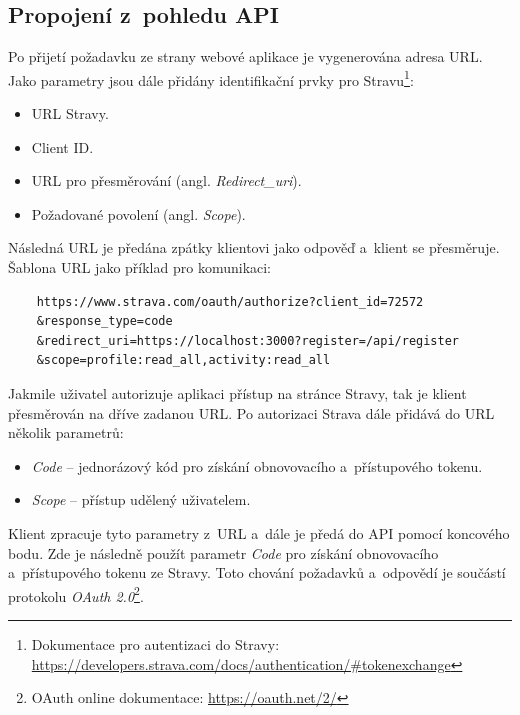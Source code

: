\subsection{Propojení z~pohledu API}
Po přijetí požadavku ze strany webové aplikace je vygenerována adresa URL. Jako parametry jsou dále přidány identifikační prvky pro Stravu\footnote{Dokumentace pro autentizaci do Stravy: \url{https://developers.strava.com/docs/authentication/\#tokenexchange}}:
\begin{itemize}
    \item URL Stravy.
    \item Client ID.
    \item URL pro přesměrování (angl. \emph{Redirect\_uri}).
    \item Požadované povolení (angl. \emph{Scope}).
\end{itemize}
Následná URL je předána zpátky klientovi jako odpověď a~klient se přesměruje.
Šablona URL jako příklad pro komunikaci:
\begin{verbatim}
    https://www.strava.com/oauth/authorize?client_id=72572
    &response_type=code
    &redirect_uri=https://localhost:3000?register=/api/register
    &scope=profile:read_all,activity:read_all
\end{verbatim}
Jakmile uživatel autorizuje aplikaci přístup na stránce Stravy, tak je klient přesměrován na dříve zadanou URL. Po autorizaci Strava dále přidává do URL několik parametrů:
\begin{itemize}
    \item \emph{Code} -- jednorázový kód pro získání obnovovacího a~přístupového tokenu.
    \item \emph{Scope} -- přístup udělený uživatelem.
\end{itemize}
Klient zpracuje tyto parametry z~URL a~dále je předá do API pomocí koncového bodu. Zde je následně použít parametr \emph{Code} pro získání obnovovacího a~přístupového tokenu ze Stravy. Toto chování požadavků a~odpovědí je součástí protokolu \emph{OAuth 2.0}\footnote{OAuth online dokumentace: \url{https://oauth.net/2/}}.

